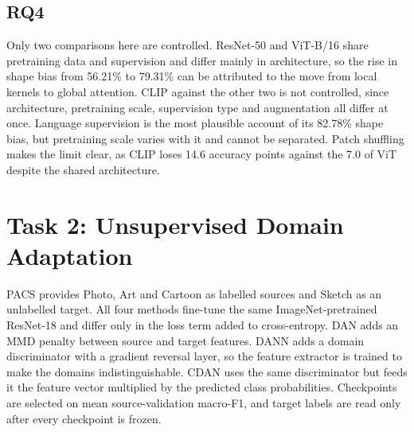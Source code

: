 \documentclass{article}
\begin{document}
\subsection{RQ4}

Only two comparisons here are controlled. ResNet-50 and ViT-B/16 share
pretraining data and supervision and differ mainly in architecture, so the
rise in shape bias from 56.21\% to 79.31\% can be attributed to the move from
local kernels to global attention. CLIP against the other two is not
controlled, since architecture, pretraining scale, supervision type and
augmentation all differ at once. Language supervision is the most plausible
account of its 82.78\% shape bias, but pretraining scale varies with it and
cannot be separated. Patch shuffling makes the limit clear, as CLIP loses
14.6 accuracy points against the 7.0 of ViT despite the shared architecture.

\section{Task 2: Unsupervised Domain Adaptation}
\label{sec:task2}

PACS provides Photo, Art and Cartoon as labelled sources and Sketch as an
unlabelled target. All four methods fine-tune the same ImageNet-pretrained
ResNet-18 and differ only in the loss term added to cross-entropy. DAN adds
an MMD penalty between source and target features. DANN adds a domain
discriminator with a gradient reversal layer, so the feature extractor is
trained to make the domains indistinguishable. CDAN uses the same
discriminator but feeds it the feature vector multiplied by the predicted
class probabilities. Checkpoints are selected on mean source-validation
macro-F1, and target labels are read only after every checkpoint is frozen.
\end{document}
